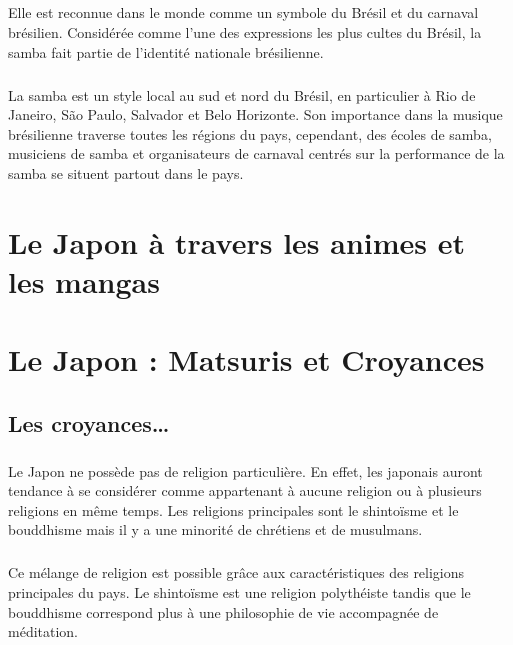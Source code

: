 \paragraph{} Elle est reconnue dans le monde comme un symbole du Brésil et du
carnaval brésilien. Considérée comme l'une des expressions les plus cultes du
Brésil, la samba fait partie de l'identité nationale brésilienne.

\paragraph{} La samba est un style local au sud et nord du Brésil, en
particulier à Rio de Janeiro, São Paulo, Salvador et Belo Horizonte. Son
importance dans la musique brésilienne traverse toutes les régions du pays,
cependant, des écoles de samba, musiciens de samba et organisateurs de carnaval
centrés sur la performance de la samba se situent partout dans le pays.

\chapter{Le Japon à travers les animes et les mangas}

\chapter{Le Japon : Matsuris et Croyances}

\section{Les croyances\ldots}

\paragraph{} Le Japon ne possède pas de religion particulière. En effet, les
japonais auront tendance à se considérer comme appartenant à aucune religion ou
à plusieurs religions en même temps. Les religions principales sont le
shintoïsme et le bouddhisme mais il y a une minorité de chrétiens et de
musulmans.

\paragraph{} Ce mélange de religion est possible grâce aux caractéristiques des
religions principales du pays. Le shintoïsme est une religion polythéiste
tandis que le bouddhisme correspond plus à une philosophie de vie accompagnée
de méditation.

